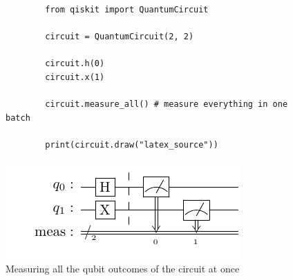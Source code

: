 \begin{figure}[ht]
    \begin{verbatim}
        from qiskit import QuantumCircuit
    
        circuit = QuantumCircuit(2, 2)
        
        circuit.h(0)
        circuit.x(1)
    
        circuit.measure_all() # measure everything in one batch
    
        print(circuit.draw("latex_source"))
    \end{verbatim}
    \centering
    \includegraphics{images/4_Qiskit/example_meas_all_1.pdf}
    \caption{Measuring all the qubit outcomes of the circuit at once}
\end{figure}